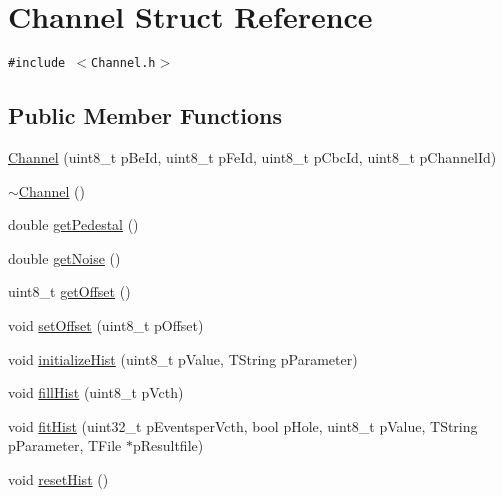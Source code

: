 \hypertarget{struct_channel}{
\section{Channel Struct Reference}
\label{struct_channel}
}
{\tt \#include $<$Channel.h$>$}

\subsection*{Public Member Functions}
\begin{CompactItemize}
\item 
\hyperlink{struct_channel_9020dabc51a3a2bc7ba558cc3b5c8c45}{Channel} (uint8\_\-t p\-Be\-Id, uint8\_\-t p\-Fe\-Id, uint8\_\-t p\-Cbc\-Id, uint8\_\-t p\-Channel\-Id)
\item 
\hyperlink{struct_channel_5f15ebd302464069f1a9e3f0ded14482}{$\sim$Channel} ()
\item 
double \hyperlink{struct_channel_e76c0ccc6dc03c5e016cdec79a3df739}{get\-Pedestal} ()
\item 
double \hyperlink{struct_channel_570a341791f9709d3fca63ffa9ec8e16}{get\-Noise} ()
\item 
uint8\_\-t \hyperlink{struct_channel_cb087e09d25e9de182a6d97d8c3dcd6e}{get\-Offset} ()
\item 
void \hyperlink{struct_channel_a88adf1f3058e04b8763ffffe6e9b1d8}{set\-Offset} (uint8\_\-t p\-Offset)
\item 
void \hyperlink{struct_channel_4bb2e116319e8c5122c821e82a56cb89}{initialize\-Hist} (uint8\_\-t p\-Value, TString p\-Parameter)
\item 
void \hyperlink{struct_channel_db1b3676dac071110ef0df05a9ac8611}{fill\-Hist} (uint8\_\-t p\-Vcth)
\item 
void \hyperlink{struct_channel_01bed9b8126d353efbcb93edf93cff4f}{fit\-Hist} (uint32\_\-t p\-Eventsper\-Vcth, bool p\-Hole, uint8\_\-t p\-Value, TString p\-Parameter, TFile $\ast$p\-Resultfile)
\item 
void \hyperlink{struct_channel_e97d073ff9a992d141eb8350f6c504ff}{reset\-Hist} ()
\end{CompactItemize}
